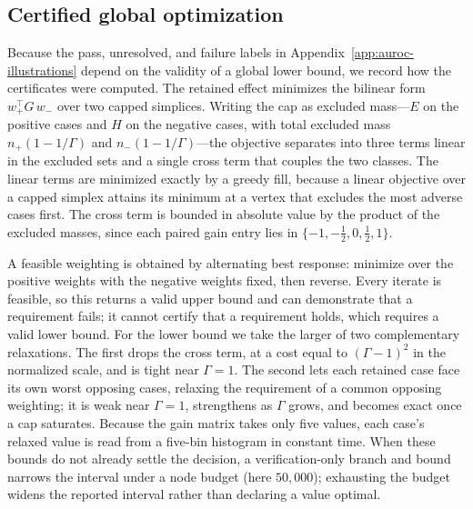 \documentclass[11pt]{article}
\theoremstyle{remark}
\begin{document}
\subsection{Certified global optimization}
\label{app:auroc-certification}

Because the pass, unresolved, and failure labels in
Appendix~\ref{app:auroc-illustrations} depend on the validity of a global lower
bound, we record how the certificates were computed. The retained effect
minimizes the bilinear form $w_+^\top G\,w_-$ over two capped simplices. Writing
the cap as excluded mass---$E$ on the positive cases and $H$ on the negative
cases, with total excluded mass $n_+(1-1/\Gamma)$ and $n_-(1-1/\Gamma)$---the
objective separates into three terms linear in the excluded sets and a single
cross term that couples the two classes. The linear terms are minimized exactly
by a greedy fill, because a linear objective over a capped simplex attains its
minimum at a vertex that excludes the most adverse cases first. The cross term
is bounded in absolute value by the product of the excluded masses, since each
paired gain entry lies in $\{-1,-\tfrac12,0,\tfrac12,1\}$.

A feasible weighting is obtained by alternating best response: minimize over the
positive weights with the negative weights fixed, then reverse. Every iterate is
feasible, so this returns a valid upper bound and can demonstrate that a
requirement fails; it cannot certify that a requirement holds, which requires a
valid lower bound. For the lower bound we take the larger of two complementary
relaxations. The first drops the cross term, at a cost equal to $(\Gamma-1)^2$ in
the normalized scale, and is tight near $\Gamma=1$. The second lets each
retained case face its own worst opposing cases, relaxing the requirement of a
common opposing weighting; it is weak near $\Gamma=1$, strengthens as $\Gamma$
grows, and becomes exact once a cap saturates. Because the gain matrix takes
only five values, each case's relaxed value is read from a five-bin histogram in
constant time. When these bounds do not already settle the decision, a
verification-only branch and bound narrows the interval under a node budget
(here $50{,}000$); exhausting the budget widens the reported interval rather than
declaring a value optimal.
\end{document}
